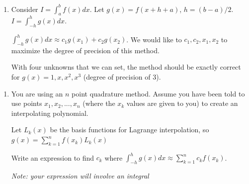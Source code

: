 \documentclass[12pt,letterpaper,noanswers]{exam}
\begin{document}
\begin{enumerate}[resume=classQ]
    \item Consider $I = \int_a^b f(x)dx$.  Let $g(x) = f(x+h+a)$, $h = (b-a)/2$.  $I = \int_{-h}^h g(x) dx$.
    
        $\int_{-h}^h g(x) dx \approx c_1 g(x_1) + c_2 g(x_2)$.  We would like to $c_1, c_2, x_1, x_2$ to maximize the degree of precision of this method.  
        
        With four unknowns that we can set, the method should be exactly correct for $g(x) = 1, x, x^2, x^3$ (degree of precision of $3$).
\end{enumerate}

\begin{enumerate}[resume=classQ]
\item You are using an $n$ point quadrature method.  Assume you have been told to use points $x_1, x_2, ..., x_n$ (where the $x_k$ values are given to you) to create an interpolating polynomial.

Let $L_k(x)$ be the basis functions for Lagrange interpolation, so $g(x) = \sum\limits_{k=1}^n f(x_k) L_k(x)$

Write an expression to find $c_k$ where $\displaystyle\int_{-h}^h g(x) dx \approx \sum\limits_{k=1}^n c_k f(x_k)$.

\emph{Note: your expression will involve an integral}

\vspace{1in}




\end{enumerate}
\end{document}
